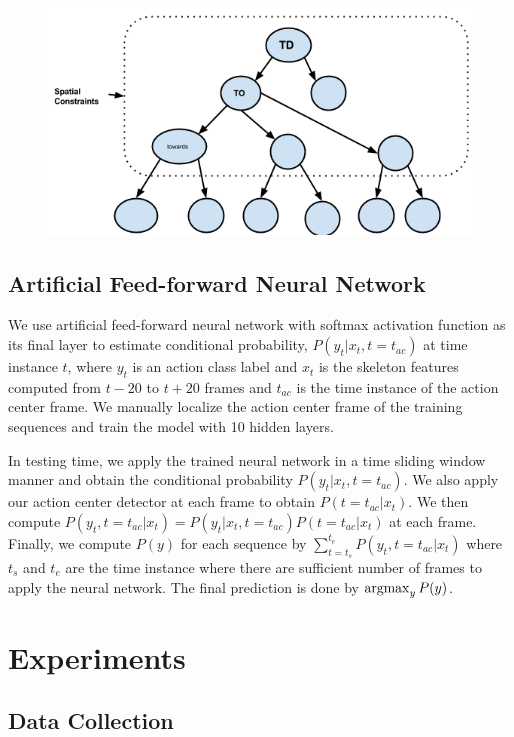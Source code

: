 \documentclass[10pt,twocolumn,letterpaper]{article}
\newcommand{\argmax}{\operatornamewithlimits{argmax}}
\begin{document}
\begin{figure}[ht]
\centering

  \includegraphics[scale = 0.3]{dec_tree.png}%
  \label{Fig:tree}%

\end{figure}

\subsection{Artificial Feed-forward Neural Network}
We use artificial feed-forward neural network with softmax activation function as its final layer to estimate conditional probability, $P(y_t|x_t,t=t_{ac})$ at time instance $t$, where $y_t$ is an action class label and $x_t$ is the skeleton features computed from $t-20$ to $t+20$ frames and $t_{ac}$ is the time instance of the action center frame. We manually localize the action center frame of the training sequences and train the model with 10 hidden layers.

In testing time, we apply the trained neural network in a time sliding window manner and obtain the conditional probability $P(y_t|x_t,t=t_{ac})$. We also apply our action center detector at each frame to obtain $P(t=t_{ac}|x_t)$. We then compute $P(y_t,t=t_{ac}|x_t)=P(y_t|x_t,t=t_{ac}) P(t=t_{ac}|x_t)$ at each frame. Finally, we compute $P(y)$ for each sequence by $\sum_{t=t_{s}}^{t_{e}} P(y_t,t=t_{ac}|x_t)$ where $t_{s}$ and $t_{e}$ are the time instance where there are sufficient number of frames to apply the neural network. The final prediction is done by $\argmax_{y} P(y)$.

\section{Experiments}

\subsection{Data Collection}
\end{document}
